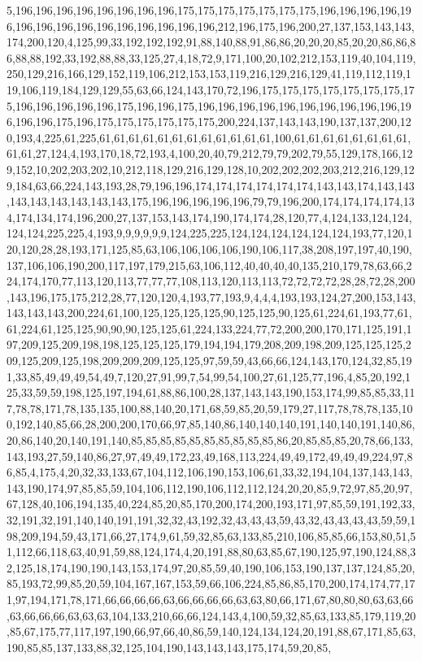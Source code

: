 5,196,196,196,196,196,196,196,196,175,175,175,175,175,175,175,196,196,196,196,196,196,196,196,196,196,196,196,196,196,196,212,196,175,196,200,27,137,153,143,143,174,200,120,4,125,99,33,192,192,192,91,88,140,88,91,86,86,20,20,20,85,20,20,86,86,86,88,88,192,33,192,88,88,33,125,27,4,18,72,9,171,100,20,102,212,153,119,40,104,119,250,129,216,166,129,152,119,106,212,153,153,119,216,129,216,129,41,119,112,119,119,106,119,184,129,129,55,63,66,124,143,170,72,196,175,175,175,175,175,175,175,175,196,196,196,196,196,175,196,196,175,196,196,196,196,196,196,196,196,196,196,196,196,196,175,196,175,175,175,175,175,175,200,224,137,143,143,190,137,137,200,120,193,4,225,61,225,61,61,61,61,61,61,61,61,61,61,61,61,100,61,61,61,61,61,61,61,61,61,61,27,124,4,193,170,18,72,193,4,100,20,40,79,212,79,79,202,79,55,129,178,166,129,152,10,202,203,202,10,212,118,129,216,129,128,10,202,202,202,203,212,216,129,129,184,63,66,224,143,193,28,79,196,196,174,174,174,174,174,174,143,143,174,143,143,143,143,143,143,143,143,175,196,196,196,196,196,79,79,196,200,174,174,174,174,134,174,134,174,196,200,27,137,153,143,174,190,174,174,28,120,77,4,124,133,124,124,124,124,225,225,4,193,9,9,9,9,9,9,124,225,225,124,124,124,124,124,124,193,77,120,120,120,28,28,193,171,125,85,63,106,106,106,106,190,106,117,38,208,197,197,40,190,137,106,106,190,200,117,197,179,215,63,106,112,40,40,40,40,135,210,179,78,63,66,224,174,170,77,113,120,113,77,77,77,108,113,120,113,113,72,72,72,72,28,28,72,28,200,143,196,175,175,212,28,77,120,120,4,193,77,193,9,4,4,4,193,193,124,27,200,153,143,143,143,143,200,224,61,100,125,125,125,125,90,125,125,90,125,61,224,61,193,77,61,61,224,61,125,125,90,90,90,125,125,61,224,133,224,77,72,200,200,170,171,125,191,197,209,125,209,198,198,125,125,125,179,194,194,179,208,209,198,209,125,125,125,209,125,209,125,198,209,209,209,125,125,97,59,59,43,66,66,124,143,170,124,32,85,191,33,85,49,49,49,54,49,7,120,27,91,99,7,54,99,54,100,27,61,125,77,196,4,85,20,192,125,33,59,59,198,125,197,194,61,88,86,100,28,137,143,143,190,153,174,99,85,85,33,117,78,78,171,78,135,135,100,88,140,20,171,68,59,85,20,59,179,27,117,78,78,78,135,100,192,140,85,66,28,200,200,170,66,97,85,140,86,140,140,140,191,140,140,191,140,86,20,86,140,20,140,191,140,85,85,85,85,85,85,85,85,85,85,86,20,85,85,85,20,78,66,133,143,193,27,59,140,86,27,97,49,49,172,23,49,168,113,224,49,49,172,49,49,49,224,97,86,85,4,175,4,20,32,33,133,67,104,112,106,190,153,106,61,33,32,194,104,137,143,143,143,190,174,97,85,85,59,104,106,112,190,106,112,112,124,20,20,85,9,72,97,85,20,97,67,128,40,106,194,135,40,224,85,20,85,170,200,174,200,193,171,97,85,59,191,192,33,32,191,32,191,140,140,191,191,32,32,43,192,32,43,43,43,59,43,32,43,43,43,43,59,59,198,209,194,59,43,171,66,27,174,9,61,59,32,85,63,133,85,210,106,85,85,66,153,80,51,51,112,66,118,63,40,91,59,88,124,174,4,20,191,88,80,63,85,67,190,125,97,190,124,88,32,125,18,174,190,190,143,153,174,97,20,85,59,40,190,106,153,190,137,137,124,85,20,85,193,72,99,85,20,59,104,167,167,153,59,66,106,224,85,86,85,170,200,174,174,77,171,97,194,171,78,171,66,66,66,66,63,66,66,66,66,63,63,80,66,171,67,80,80,80,63,63,66,63,66,66,66,63,63,63,104,133,210,66,66,124,143,4,100,59,32,85,63,133,85,179,119,20,85,67,175,77,117,197,190,66,97,66,40,86,59,140,124,134,124,20,191,88,67,171,85,63,190,85,85,137,133,88,32,125,104,190,143,143,143,175,174,59,20,85,